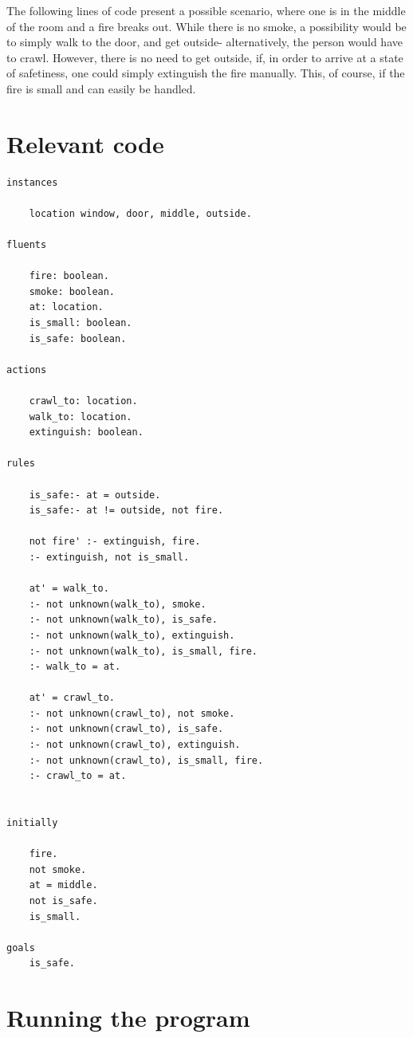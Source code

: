 \documentclass[a4paper,12pt]{report}
\begin{document}
	The following lines of code present a possible scenario, where one is in the middle of the room and a fire breaks out.
While there is no smoke, a possibility would be to simply walk to the door, and get outside- alternatively, the person would have to crawl. However, there is no need to get outside, if, in order to arrive at a state of safetiness, one could simply extinguish the fire manually. This, of course, if the fire is small and can easily be handled.


\section{Relevant code}

\begin{verbatim}
instances

	location window, door, middle, outside.

fluents

	fire: boolean.
	smoke: boolean.
	at: location.
	is_small: boolean.
	is_safe: boolean.

actions

	crawl_to: location.
	walk_to: location.
	extinguish: boolean.	

rules

	is_safe:- at = outside.
	is_safe:- at != outside, not fire.
	
	not fire' :- extinguish, fire.
	:- extinguish, not is_small.
	
	at' = walk_to.
	:- not unknown(walk_to), smoke.
	:- not unknown(walk_to), is_safe.
	:- not unknown(walk_to), extinguish.
	:- not unknown(walk_to), is_small, fire.
	:- walk_to = at.	

	at' = crawl_to.
	:- not unknown(crawl_to), not smoke.
	:- not unknown(crawl_to), is_safe.
	:- not unknown(crawl_to), extinguish.
	:- not unknown(crawl_to), is_small, fire.
	:- crawl_to = at.

	
initially

	fire.
	not smoke.
	at = middle.
	not is_safe.
	is_small.	

goals
	is_safe.
\end{verbatim}

\section{Running the program}
\end{document}
